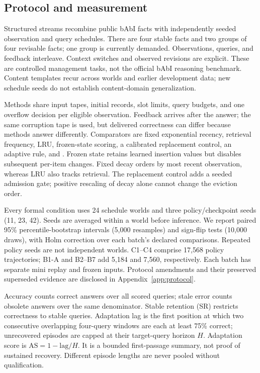 \subsection{Protocol and measurement}
Structured streams recombine public bAbI facts \citep{babi} with independently seeded observation and query schedules. There are four stable facts and two groups of four revisable facts; one group is currently demanded. Observations, queries, and feedback interleave. Context switches and observed revisions are explicit. These are controlled management tasks, not the official bAbI reasoning benchmark. Content templates recur across worlds and earlier development data; new schedule seeds do not establish content-domain generalization.

Methods share input tapes, initial records, slot limits, query budgets, and one overflow decision per eligible observation. Feedback arrives after the answer; the same corruption tape is used, but delivered correctness can differ because methods answer differently. Comparators are fixed exponential recency, retrieval frequency, LRU, frozen-state scoring, a calibrated replacement control, an adaptive rule, and \ame. Frozen state retains learned insertion values but disables subsequent per-item changes. Fixed decay orders by most recent observation, whereas LRU also tracks retrieval. The replacement control adds a seeded admission gate; positive rescaling of decay alone cannot change the eviction order.

Every formal condition uses 24 schedule worlds and three policy/checkpoint seeds (11, 23, 42). Seeds are averaged within a world before inference. We report paired 95\% percentile-bootstrap intervals (5,000 resamples) and sign-flip tests (10,000 draws), with Holm correction over each batch's declared comparisons. Repeated policy seeds are not independent worlds. C1--C4 comprise 17,568 policy trajectories; B1-A and B2--B7 add 5,184 and 7,560, respectively. Each batch has separate mini replay and frozen inputs. Protocol amendments and their preserved superseded evidence are disclosed in Appendix~\ref{app:protocol}.

Accuracy counts correct answers over all scored queries; stale error counts obsolete answers over the same denominator. Stable retention (SR) restricts correctness to stable queries. Adaptation lag is the first position at which two consecutive overlapping four-query windows are each at least 75\% correct; unrecovered episodes are capped at their target-query horizon $H$. Adaptation score is $\mathrm{AS}=1-\mathrm{lag}/H$. It is a bounded first-passage summary, not proof of sustained recovery. Different episode lengths are never pooled without qualification.

